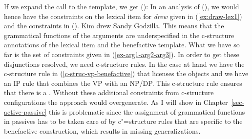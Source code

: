 If we expand the call to the  template, we get ():
\ea
{}
\z
In an analysis of (), we would hence have the constraints on the lexical item for \emph{drew}
given in (\ref{ex:draw-lex1}) and the constraints in ().
\ea
Kim drew Sandy Godzilla.
\z
This means that the grammatical functions of the arguments are underspecified in the c-structure annotations of the lexical item and
the benefactive template. What we have so far is the set of constraints given in
(\ref{ex-arg1-arg2-arg3}). In order to get these disjunctions
resolved\label{page-disjunctions-gf-c-structure}, 
we need c-structure rules. In the case at hand we have the c-structure rule in (\ref{c-struc-vp-benefactive}) that
licenses the objects and we have an IP rule that combines the VP with an NP/DP. This c-structure
rule ensures that there is a \subj. Without these additional constraints from c-structure
configurations the approach would overgenerate. As I will show in Chapter~\ref{sec-active-passive} this is
problematic since the assignment of grammatical functions in passives has to be taken care of by
c"=structure rules that are specific to the benefactive construction, which results in missing generalizations.

